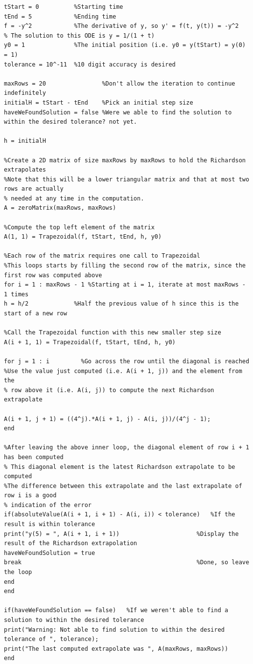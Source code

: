 \documentclass{article}
\begin{document}
\begin{verbatim}
tStart = 0          %Starting time
tEnd = 5            %Ending time
f = -y^2            %The derivative of y, so y' = f(t, y(t)) = -y^2
% The solution to this ODE is y = 1/(1 + t)
y0 = 1              %The initial position (i.e. y0 = y(tStart) = y(0) = 1)
tolerance = 10^-11  %10 digit accuracy is desired

maxRows = 20                %Don't allow the iteration to continue indefinitely
initialH = tStart - tEnd    %Pick an initial step size
haveWeFoundSolution = false %Were we able to find the solution to within the desired tolerance? not yet.

h = initialH

%Create a 2D matrix of size maxRows by maxRows to hold the Richardson extrapolates
%Note that this will be a lower triangular matrix and that at most two rows are actually
% needed at any time in the computation.
A = zeroMatrix(maxRows, maxRows)

%Compute the top left element of the matrix
A(1, 1) = Trapezoidal(f, tStart, tEnd, h, y0)

%Each row of the matrix requires one call to Trapezoidal
%This loops starts by filling the second row of the matrix, since the first row was computed above
for i = 1 : maxRows - 1 %Starting at i = 1, iterate at most maxRows - 1 times
h = h/2             %Half the previous value of h since this is the start of a new row

%Call the Trapezoidal function with this new smaller step size
A(i + 1, 1) = Trapezoidal(f, tStart, tEnd, h, y0)

for j = 1 : i         %Go across the row until the diagonal is reached
%Use the value just computed (i.e. A(i + 1, j)) and the element from the
% row above it (i.e. A(i, j)) to compute the next Richardson extrapolate

A(i + 1, j + 1) = ((4^j).*A(i + 1, j) - A(i, j))/(4^j - 1);
end

%After leaving the above inner loop, the diagonal element of row i + 1 has been computed
% This diagonal element is the latest Richardson extrapolate to be computed  
%The difference between this extrapolate and the last extrapolate of row i is a good
% indication of the error
if(absoluteValue(A(i + 1, i + 1) - A(i, i)) < tolerance)   %If the result is within tolerance
print("y(5) = ", A(i + 1, i + 1))                      %Display the result of the Richardson extrapolation
haveWeFoundSolution = true
break                                                  %Done, so leave the loop
end
end

if(haveWeFoundSolution == false)   %If we weren't able to find a solution to within the desired tolerance
print("Warning: Not able to find solution to within the desired tolerance of ", tolerance);
print("The last computed extrapolate was ", A(maxRows, maxRows))
end
\end{verbatim}
\end{document}
